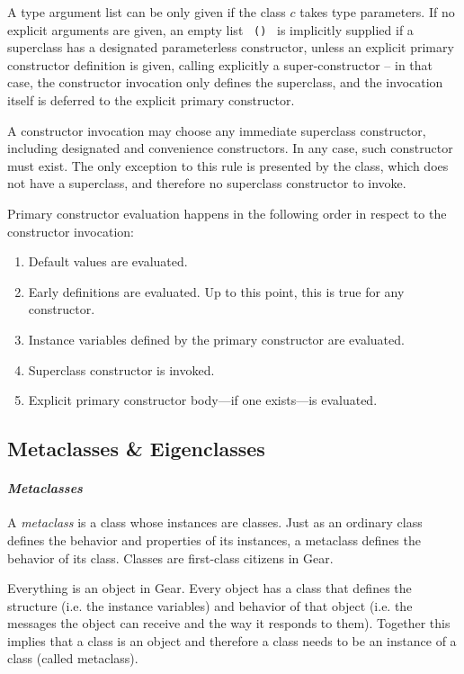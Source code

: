 A type argument list can be only given if the class $c$ takes type parameters. If no explicit arguments are given, an empty list ~\lstinline!()!~ is implicitly supplied if a superclass has a designated parameterless constructor, unless an explicit primary constructor definition is given, calling explicitly a super-constructor -- in that case, the constructor invocation only defines the superclass, and the invocation itself is deferred to the explicit primary constructor. 

A constructor invocation may choose any immediate superclass constructor, including designated and convenience constructors. In any case, such constructor must exist. The only exception to this rule is presented by the  class, which does not have a superclass, and therefore no superclass constructor to invoke. 

Primary constructor evaluation happens in the following order in respect to the constructor invocation: 
\begin{enumerate}
  \item Default values are evaluated. 
  \item Early definitions are evaluated. Up to this point, this is true for any constructor. 
  \item Instance variables defined by the primary constructor are evaluated. 
  \item Superclass constructor is invoked. 
  \item Explicit primary constructor body---if one exists---is evaluated. 
\end{enumerate}





\subsection{Metaclasses \& Eigenclasses}
\label{sec:metaclasses}
\label{sec:eigenclasses}

\paragraph{\em Metaclasses}
A {\em metaclass} is a class whose instances are classes. Just as an ordinary class defines the behavior and properties of its instances, a metaclass defines the behavior of its class. Classes are first-class citizens in Gear. 

Everything is an object in Gear. Every object has a class that defines the structure (i.e. the instance variables) and behavior of that object (i.e. the messages the object can receive and the way it responds to them). Together this implies that a class is an object and therefore a class needs to be an instance of a class (called metaclass). 

